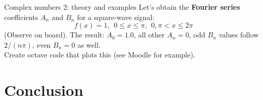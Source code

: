 \documentclass{beamer}
\begin{document}
\begin{frame}{Complex numbers 2: theory and examples}
Let's obtain the \alert{\textbf{Fourier series}} coefficients $A_n$ and $B_n$ for a square-wave signal:
\begin{equation}
f(x) = 1, ~~ 0 \leq x \leq \pi, ~~ 0,  \pi < x \leq 2\pi 
\end{equation}
(Observe on board).  The result: $A_0 = 1.0$, all other $A_n = 0$, odd $B_n$ values follow $2/(n\pi)$, even $B_n = 0$ as well. \\ \vspace{0.5cm}
Create octave code that plots this (see Moodle for example).
\end{frame}

\section{Conclusion}
\end{document}
